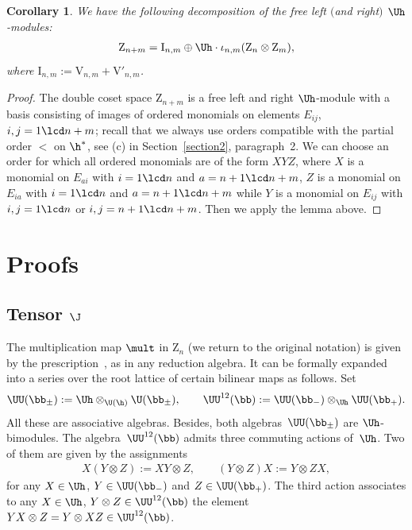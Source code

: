 \documentclass[11pt]{article}
\newtheorem{cor}[theorem]{Corollary}
\def\UUb{\UU^{12}(\bb)}\def\V{\mathrm {V}}\def\ve{\varepsilon}\def\Z{\mathrm{Z}}\def\SZ{\mathrm{SZ}}
\numberwithin{equation}{section}
\begin{document}
\begin{cor}\label{corollary1}
We have the following decomposition of the free left $($and right$)$ $\Uh$-modules:
\begin{gather}\label{st4}
\Z_{n+m}= \mathrm{I}_{n,m}\oplus \Uh\cdot\iota_{n,m}(\Z_n\otimes\Z_m)   ,
\end{gather}
where $\mathrm{I}_{n,m}:=\V_{n,m}+\V'_{n,m}$.
\end{cor}

\begin{proof} The double coset space $\Z_{n+m}$ is a free left and right $\Uh$-module with a basis consisting of images of ordered monomials on elements
$E_{ij}$, $i,j=1\lcd n+m$; recall that we always use orders compatible with the partial order $<$ on $\h^*$, see (c) in Section~\ref{section2},
paragraph~2. We can choose an order for which all ordered monomials are of the form $XYZ$, where $X$ is a monomial on $E_{ai}$ with
$i=1\lcd n$ and $a=n+1\lcd n+m$, $Z$ is a monomial on $E_{ia}$  with $i=1\lcd n$ and $a=n+1\lcd n+m$ while $Y$ is a monomial on
$E_{ij}$ with $i,j=1\lcd n$ or $i,j=n+1\lcd n+m$. Then we apply the lemma above.
\end{proof}
\setcounter{section}{4}
\setcounter{subsection}{6}
\setcounter{subsubsection}{0}
\setcounter{equation}{28}
\section{Proofs}\label{sectionproofs}


\subsection[Tensor $\J$]{Tensor $\boldsymbol{\J}$}\label{sectionJ}

The multiplication map $\mult$ in $\Z_n$ (we return to the original notation) is given by the
prescription~, as in any reduction algebra. It can be formally expanded into
a series over the root lattice of certain bilinear maps as follows. Set
\begin{gather*}
\UU(\bb_\pm):=\Uh\otimes_{\U(\h)}\U(\bb_\pm)  , \qquad \UUb:=\UU(\bb_-)\otimes_{\Uh}  \UU(\bb_+)  .
\end{gather*}
All these are associative algebras. Besides, both algebras~$\UU(\bb_\pm)$ are $\Uh$-bimodules. The
algebra~$\UUb$ admits three commuting actions of~$\Uh$. Two of them are given by the assignments
\begin{gather*}
X(Y\otimes Z):=XY\otimes Z  ,\qquad (Y\otimes Z)X:=Y\otimes ZX  ,
\end{gather*}
for any $X\in\Uh$, $Y\in\UU(\bb_-)$ and $Z\in\UU(\bb_+)$.
The third action associates to any $X\in\Uh$, $Y\otimes Z\in\UUb$ the element $YX\otimes Z=Y\otimes XZ\in\UUb$.
\end{document}
